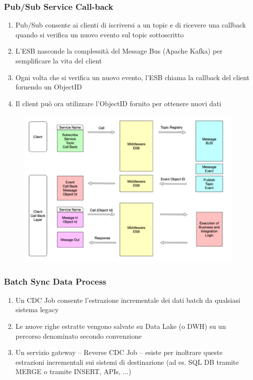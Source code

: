 \documentclass{article}
\begin{document}
\subsubsection{Pub/Sub Service Call-back}
\begin{enumerate}
    \item Pub/Sub consente ai clienti di iscriversi a un topic e di ricevere una callback quando si verifica un nuovo evento sul topic sottoscritto
    \item L'ESB nasconde la complessità del Message Bus (Apache Kafka) per semplificare la vita del client
    \item Ogni volta che si verifica un nuovo evento, l'ESB chiama la callback del client fornendo un ObjectID
    \item Il client può ora utilizzare l'ObjectID fornito per ottenere nuovi dati
\end{enumerate}

\begin{figure}[htp]
    \centering
    \includegraphics[width=\linewidth]{fig/pub_sub_service_call_back.png}
    \label{fig:Pub/Sub Service Call-back}
\end{figure}

\subsubsection{Batch Sync Data Process}
\begin{enumerate}
    \item Un CDC Job consente l'estrazione incrementale dei dati batch da qualsiasi sistema legacy
    \item Le nuove righe estratte vengono salvate su Data Lake (o DWH) su un percorso denominato secondo convenzione
    \item Un servizio gateway – Reverse CDC Job – esiste per inoltrare queste estrazioni incrementali sui sistemi di destinazione (ad es. SQL DB tramite MERGE o tramite INSERT, APIs, ...)
\end{enumerate}
\end{document}
